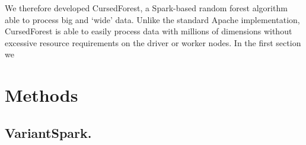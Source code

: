\documentclass[10pt,letterpaper]{article}
\begin{document}

We therefore developed CursedForest, a Spark-based random forest algorithm able to process big and `wide' data. Unlike
the standard Apache implementation, CursedForest is able to easily process data with millions of dimensions without
excessive resource requirements on the driver or worker nodes.
In the first section we 


\section*{Methods}




\subsection*{VariantSpark.}



\end{document}
